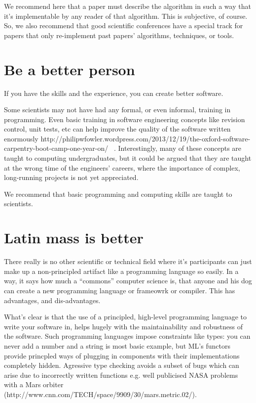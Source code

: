 \documentclass[conference]{IEEEtran}
\begin{document}
We recommend here that a paper must describe the algorithm in such a
way that it's implementable by any reader of that algorithm. This is
subjective, of course. So, we also recommend that good scientific
conferences have a special track for papers that only re-implement
past papers' algorithms, techniques, or tools.



\section{Be a better person}

If you have the skills and the experience, you can create better software. 

Some scientists may not have had any formal, or even informal,
training in programming. Even basic training in software engineering
concepts like revision control, unit tests, etc can help improve the
quality of the software written enormously
http://philipwfowler.wordpress.com/2013/12/19/the-oxford-software-carpentry-boot-camp-one-year-on/
~\cite{Wilson2014}.  
Interestingly, many of these concepts are taught
to computing undergraduates, but it could be argued that they are
taught at the wrong time of the engineers' careers, where the
importance of complex, long-running projects is not yet appreciated.

We recommend that basic programming and computing skills are taught to
scientists.


\section{Latin mass is better}

There really is no other scientific or technical field where it's
participants can just make up a non-principled artifact like a
programming language so easily. In a way, it says how much a
``commons'' computer science is, that anyone and his dog can create a
new programming language or frameowrk or compiler. This has
advantages, and dis-advantages.

What's clear is that the use of a principled, high-level programming
language to write your software in, helps hugely with the
maintainability and robustness of the software. Such programming
languages impose constraints like types: you can never add a number
and a string is most basic example, but ML's functors provide
princpled ways of plugging in components with their implementations
completely hidden. Agressive type checking avoids a subset of bugs
which can arise due to incorrectly written functions e.g. well
publicised NASA problems with a Mars orbiter
(http://www.cnn.com/TECH/space/9909/30/mars.metric.02/).
\end{document}
